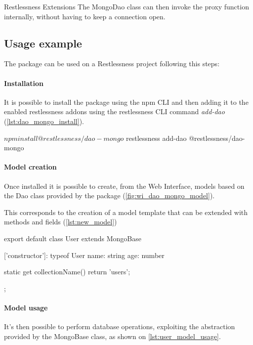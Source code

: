 \begin{chapter}{Restlessness Extensions}
    The MongoDao class can then invoke the proxy function internally, without having
    to keep a connection open.

    \subsection{Usage example}
    The package can be used on a Restlessness project following this steps:

    \paragraph{Installation}
    It is possible to install the package using the npm CLI and then adding it to
    the enabled restlessness addons using the restlessness CLI command \textit{add-dao}
    (\ref{lst:dao_mongo_install}).

    \bigskip
    \begin{code}[caption=dao-mongo installation, label={lst:dao_mongo_install}, language=shell]
$ npm install @restlessness/dao-mongo
$ restlessness add-dao @restlessness/dao-mongo
    \end{code}

    \paragraph{Model creation}
    Once installed it is possible to create, from the Web Interface, models based on
    the Dao class provided by the package (\ref{fig:wi_dao_mongo_model}).

    This corresponds to the creation of a model template that can be extended with
    methods and fields (\ref{lst:new_model})

    \bigskip
    \begin{code}[caption=A new model based on the dao-mongo package, label={lst:new_model}]
export default class User extends MongoBase {
  ['constructor']: typeof User
  name: string
  age: number

  static get collectionName() {
    return 'users';
  }
};
    \end{code}

    \paragraph{Model usage}
    It's then possible to perform database operations, exploiting the abstraction
    provided by the MongoBase class, as shown on \ref{lst:user_model_usage}.


\end{chapter}
